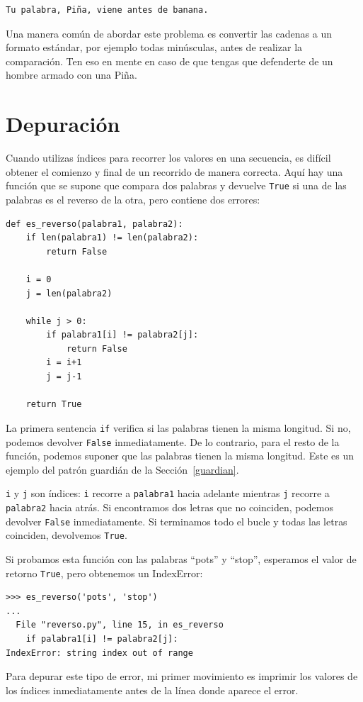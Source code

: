 \documentclass[10pt]{book}
\begin{document}
\begin{verbatim}
Tu palabra, Piña, viene antes de banana.
\end{verbatim}
%
Una manera común de abordar este problema es convertir las cadenas a un
formato estándar, por ejemplo todas minúsculas, antes de realizar
la comparación.  Ten eso en mente en caso de que tengas que defenderte
de un hombre armado con una Piña.


\section{Depuración}

Cuando utilizas índices para recorrer los valores en una secuencia,
es difícil obtener el comienzo y final de un recorrido
de manera correcta.  Aquí hay una función que se supone que compara dos
palabras y devuelve {\tt True} si una de las palabras es el reverso
de la otra, pero contiene dos errores:

\begin{verbatim}
def es_reverso(palabra1, palabra2):
    if len(palabra1) != len(palabra2):
        return False

    i = 0
    j = len(palabra2)

    while j > 0:
        if palabra1[i] != palabra2[j]:
            return False
        i = i+1
        j = j-1

    return True
\end{verbatim}
%
La primera sentencia {\tt if} verifica si las palabras tienen la
misma longitud.  Si no, podemos devolver {\tt False} inmediatamente.
De lo contrario, para el resto de la función, podemos suponer que las palabras
tienen la misma longitud.  Este es un ejemplo del patrón guardián
de la Sección~\ref{guardian}.

{\tt i} y {\tt j} son índices: {\tt i} recorre a {\tt palabra1}
hacia adelante mientras {\tt j} recorre a {\tt palabra2} hacia atrás.  Si encontramos
dos letras que no coinciden, podemos devolver {\tt False} inmediatamente.
Si terminamos todo el bucle y todas las letras coinciden,
devolvemos {\tt True}.

Si probamos esta función con las palabras ``pots'' y ``stop'',
esperamos el valor de retorno {\tt True}, pero obtenemos un IndexError:

\begin{verbatim}
>>> es_reverso('pots', 'stop')
...
  File "reverso.py", line 15, in es_reverso
    if palabra1[i] != palabra2[j]:
IndexError: string index out of range
\end{verbatim}
%
Para depurar este tipo de error, mi primer movimiento es
imprimir los valores de los índices inmediatamente antes de la línea
donde aparece el error.
\end{document}
